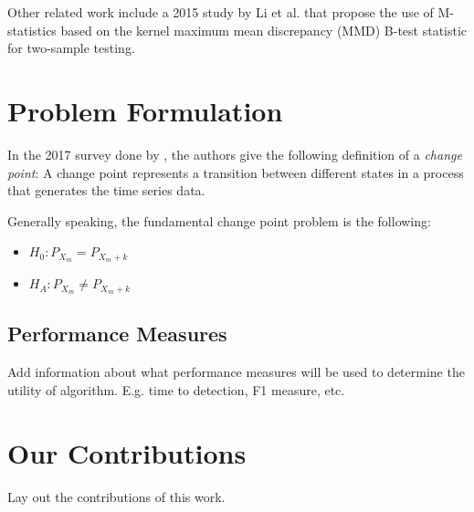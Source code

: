 Other related work include a 2015 study by Li et al. \cite{li2015m} that propose the use of M-statistics based on the kernel maximum mean discrepancy (MMD) B-test statistic for two-sample testing. %


\section{Problem Formulation}
In the 2017 survey done by , the authors give the following definition of a \textit{change point}:
A change point represents a transition between different states in a process that generates the time series data.

Generally speaking, the fundamental change point problem is the following:
\begin{itemize}
  \item $H_0: P_{X_m }=  P_{X_m+k} $
  \item $H_A: P_{X_m} \neq  P_{X_m+k} $
\end{itemize}


\subsection{Performance Measures}
Add information about what performance measures will be used to determine the utility of algorithm. E.g. time to detection, F1 measure, etc.

 

\section{Our Contributions}
Lay out the contributions of this work.
